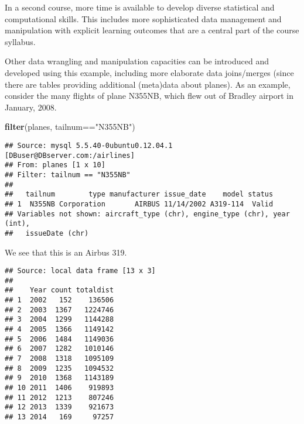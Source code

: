 \documentclass[]{article}
\newenvironment{Shaded}{\begin{snugshade}}{\end{snugshade}}
\newcommand{\KeywordTok}[1]{\textcolor[rgb]{0.13,0.29,0.53}{\textbf{{#1}}}}
\newcommand{\DataTypeTok}[1]{\textcolor[rgb]{0.13,0.29,0.53}{{#1}}}
\newcommand{\StringTok}[1]{\textcolor[rgb]{0.31,0.60,0.02}{{#1}}}
\newcommand{\NormalTok}[1]{{#1}}
\begin{document}
In a second course, more time is available to develop diverse
statistical and computational skills. This includes more sophisticated
data management and manipulation with explicit learning outcomes that
are a central part of the course syllabus.

Other data wrangling and manipulation capacities can be introduced and
developed using this example, including more elaborate data joins/merges
(since there are tables providing additional (meta)data about planes).
As an example, consider the many flights of plane N355NB, which flew out
of Bradley airport in January, 2008.

\begin{Shaded}
\begin{Highlighting}[]
\KeywordTok{filter}\NormalTok{(planes, tailnum==}\StringTok{"N355NB"}\NormalTok{)}
\end{Highlighting}
\end{Shaded}

\begin{verbatim}
## Source: mysql 5.5.40-0ubuntu0.12.04.1 [DBuser@DBserver.com:/airlines]
## From: planes [1 x 10]
## Filter: tailnum == "N355NB" 
## 
##   tailnum        type manufacturer issue_date    model status
## 1  N355NB Corporation       AIRBUS 11/14/2002 A319-114  Valid
## Variables not shown: aircraft_type (chr), engine_type (chr), year (int),
##   issueDate (chr)
\end{verbatim}

We see that this is an Airbus 319.

\begin{Shaded}
\end{Shaded}

\begin{verbatim}
## Source: local data frame [13 x 3]
## 
##    Year count totaldist
## 1  2002   152    136506
## 2  2003  1367   1224746
## 3  2004  1299   1144288
## 4  2005  1366   1149142
## 5  2006  1484   1149036
## 6  2007  1282   1010146
## 7  2008  1318   1095109
## 8  2009  1235   1094532
## 9  2010  1368   1143189
## 10 2011  1406    919893
## 11 2012  1213    807246
## 12 2013  1339    921673
## 13 2014   169     97257
\end{verbatim}
\end{document}
